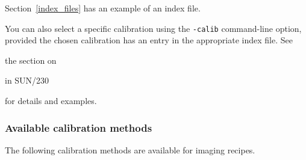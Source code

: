 \documentclass[twoside,11pt,nolof]{starlink}
\begin{document}
\begin{latexonly}
Section~\ref{index_files} has an example of an index file.
\end{latexonly}

You can also select a specific calibration using the \texttt{-calib}
command-line option, provided the chosen calibration has an entry
in the appropriate index file.  See
\begin{latexonly}
the section on
\end{latexonly}
\begin{latexonly}
in SUN/230
\end{latexonly}
for details and examples.

\subsubsection{Available calibration methods\label{available_calib}}

The following calibration methods are available for imaging recipes.
\end{document}

